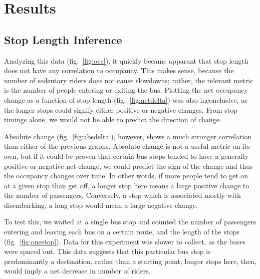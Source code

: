\section{Results}

\subsection{Stop Length Inference}

Analyzing this data (fig.~\ref{fig:occ}), it quickly became apparant that stop length does not have any correlation to occupancy.
This makes sense, because the number of sedentary riders does not cause slowdowns; rather, the relevant metric is the number of people entering or exiting the bus.
Plotting the net occupancy change as a function of stop length (fig.~\ref{fig:netdelta}) was also inconclusive, as the longer stops could signify either positive or negative changes.
From stop timings alone, we would not be able to predict the direction of change.
    

Absolute change (fig.~\ref{fig:absdelta}), however, shows a much stronger correlation than either of the previous graphs.
Absolute change is not a useful metric on its own, but if it could be proven that certain bus stops tended to have a generally positive or negative net change, we could predict the sign of the change and thus the occupancy changes over time.
In other words, if more people tend to get on at a given stop than get off, a longer stop here means a large positive change to the number of passengers.
Conversely, a stop which is associated mostly with disembarking, a long stop would mean a large negative change.

To test this, we waited at a single bus stop and counted the number of passengers entering and leaving each bus on a certain route, and the length of the stops (fig.~\ref{fig:onestop}).
Data for this experiment was slower to collect, as the buses were spaced out.
This data suggests that this particular bus stop is predominantly a destination, rather than a starting point; longer stops here, then, would imply a net decrease in number of riders.
    
